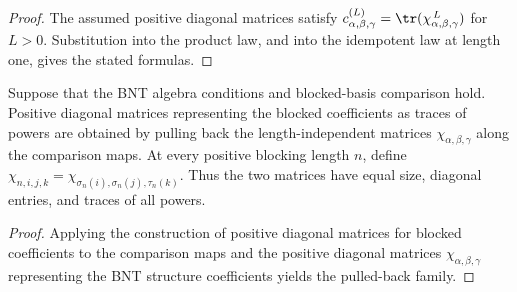 \begin{proof}\leanok
    The assumed positive diagonal matrices satisfy
    $c^{(L)}_{\alpha,\beta,\gamma}
        =\tr(\chi_{\alpha,\beta,\gamma}^{\,L})$ for $L>0$.
    Substitution into the product law, and into the idempotent law at
    length one, gives the stated formulas.
\end{proof}

\begin{lemma}%
    \label{thm:mpdo_bnt_label_theorem_data_to_positive_blocked_chi_trace_power_form}
    \leanok
    Suppose that the BNT algebra conditions and blocked-basis comparison
    hold. Positive diagonal matrices representing the blocked coefficients
    as traces of powers are obtained by pulling back the
    length-independent matrices $\chi_{\alpha,\beta,\gamma}$ along the
    comparison maps. At every positive blocking length $n$, define
    $\chi_{n,i,j,k}
        =\chi_{\sigma_n(i),\sigma_n(j),\tau_n(k)}$.
    Thus the two matrices have equal size, diagonal entries, and traces of all
    powers.
\end{lemma}
\begin{proof}\leanok
    Applying the construction of positive diagonal matrices for blocked
    coefficients to the comparison maps and the positive diagonal matrices
    $\chi_{\alpha,\beta,\gamma}$ representing the BNT structure coefficients
    yields the pulled-back family.
\end{proof}

